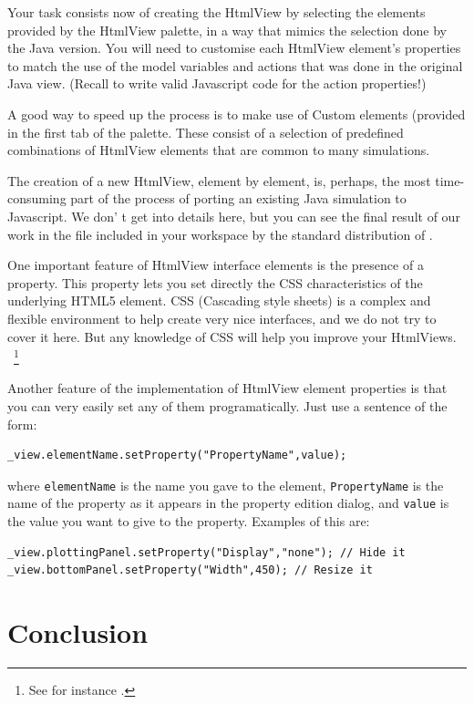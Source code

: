 Your task consists now of creating the HtmlView by selecting the elements provided by the HtmlView palette, in a way that mimics the selection done by the Java version. You will need to customise each HtmlView element's properties to match the use of the model variables and actions that was done in the original Java view. (Recall to write valid Javascript code for the action properties!)

A good way to speed up the process is to make use of Custom elements (provided in the first tab of the  palette. These consist of a selection of predefined combinations of HtmlView elements that are common to many simulations.

The creation of a new HtmlView, element by element, is, perhaps, the most time-consuming part of the process of porting an existing Java simulation to Javascript. We don' t get into details here, but you can see the final result of our work in the  file included in your workspace by the standard distribution of \ejs.

One important feature of HtmlView interface elements is the presence of a  property. This property lets you set directly the CSS characteristics of the underlying HTML5 element. CSS (Cascading style sheets) is a complex and flexible environment to help create very nice interfaces, and we do not try to cover it here. But any knowledge of CSS will help you improve your HtmlViews. ~\footnote{See for instance .}

Another feature of the implementation of HtmlView element properties is that you can very easily set any of them programatically. Just use a sentence of the form:
\begin{verbatim}
_view.elementName.setProperty("PropertyName",value);
\end{verbatim}
\noindent where \verb?elementName? is the name you gave to the element, \verb?PropertyName? is the name of the property as it appears in the property edition dialog, and \verb?value? is the value you want to give to the property. Examples of this are:
\begin{verbatim}
_view.plottingPanel.setProperty("Display","none"); // Hide it
_view.bottomPanel.setProperty("Width",450); // Resize it
\end{verbatim}

    \section{Conclusion}\label{section:04Conclusion}

